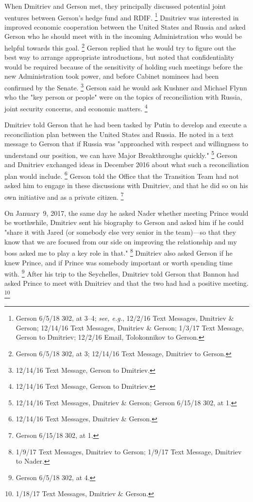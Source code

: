 When Dmitriev and Gerson met, they principally discussed potential joint ventures between Gerson's hedge fund and RDIF\null.%
\footnote{Gerson 6/5/18 302, at 3--4;
\textit{see, e.g.}, 12/2/16 Text Messages, Dmitriev \& Gerson;
12/14/16 Text Messages, Dmitriev \& Gerson;
1/3/17 Text Message, Gerson to Dmitriev;
12/2/16 Email, Tolokonnikov to Gerson.}
Dmitriev was interested in improved economic cooperation between the United States and Russia and asked Gerson who he should meet with in the incoming Administration who would be helpful towards this goal.%
\footnote{Gerson 6/5/18 302, at 3;
12/14/16 Text Message, Dmitriev to Gerson.}
Gerson replied that he would try to figure out the best way to arrange appropriate introductions, but noted that confidentiality would be required because of the sensitivity of holding such meetings before the new Administration took power, and before Cabinet nominees had been confirmed by the Senate.%
\footnote{12/14/16 Text Message, Gerson to Dmitriev.}
Gerson said he would ask Kushner and Michael Flynn who the "key person or people" were on the topics of reconciliation with Russia, joint security concerns, and economic matters.%
\footnote{12/14/16 Text Message, Gerson to Dmitriev.}

Dmitriev told Gerson that he had been tasked by Putin to develop and execute a reconciliation plan between the United States and Russia.
He noted in a text message to Gerson that if Russia was "approached with respect and willingness to understand our position, we can have Major Breakthroughs quickly."%
\footnote{12/14/16 Text Messages, Dmitriev \& Gerson;
Gerson 6/15/18 302, at 1.}
Gerson and Dmitriev exchanged ideas in December 2016 about what such a reconciliation plan would include.%
\footnote{12/14/16 Text Messages, Dmitriev \& Gerson.}
Gerson told the Office that the Transition Team had not asked him to engage in these discussions with Dmitriev, and that he did so on his own initiative and as a private citizen.%
\footnote{Gerson 6/15/18 302, at 1.}

On January~9, 2017, the same day he asked Nader whether meeting Prince would be worthwhile, Dmitriev sent his biography to Gerson and asked him if he could "share it with Jared (or somebody else very senior in the team)---so that they know that we are focused from our side on improving the relationship and my boss asked me to play a key role in that."%
\footnote{1/9/17 Text Messages, Dmitriev to Gerson;
1/9/17 Text Message, Dmitriev to Nader.}
Dmitriev also asked Gerson if he knew Prince, and if Prince was somebody important or worth spending time with.%
\footnote{Gerson 6/5/18 302, at 4.}
After his trip to the Seychelles, Dmitriev told Gerson that Bannon had asked Prince to meet with Dmitriev and that the two had had a positive meeting.%
\footnote{1/18/17 Text Messages, Dmitriev \& Gerson.}

